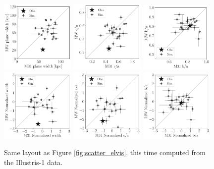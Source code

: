 \documentclass[a4paper,fleqn,usenatbib]{mnras}
\begin{document}
\begin{figure}
\centering
\includegraphics[width=0.32\textwidth]{scatter_ranked_width.pdf}
\includegraphics[width=0.32\textwidth]{scatter_ranked_ca_ratio.pdf}
\includegraphics[width=0.32\textwidth]{scatter_ranked_ba_ratio.pdf}
\includegraphics[width=0.32\textwidth]{scatter_norm_ranked_width.pdf}
\includegraphics[width=0.32\textwidth]{scatter_norm_ranked_ca_ratio.pdf}
\includegraphics[width=0.32\textwidth]{scatter_norm_ranked_ba_ratio.pdf}
\caption{Same layout as Figure \ref{fig:scatter_elvis}, this time
  computed from the Illustris-1 data.
\label{fig:scatter_illustris}}
\end{figure}
\end{document}
